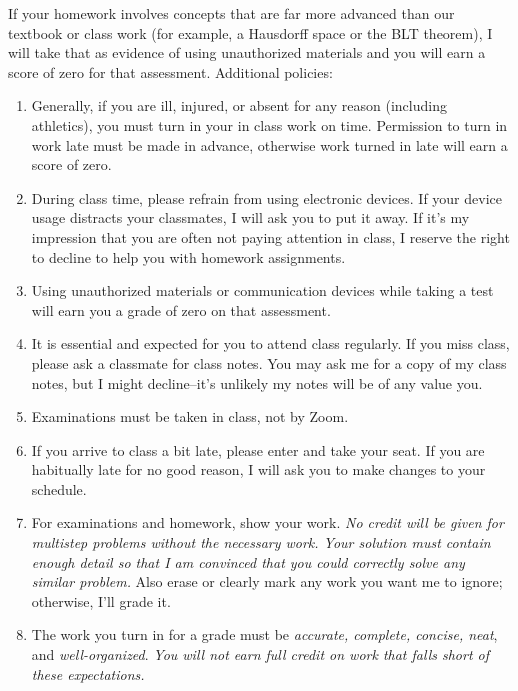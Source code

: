 \documentclass[12pt]{article}
\newcounter{ex}\setcounter{ex}{0}
\begin{document}
If your homework involves concepts that are far more advanced than
our textbook or class work (for example, a Hausdorff space or the 
BLT theorem), I will take that as evidence of using unauthorized 
materials and you will earn a score of zero for that assessment.
Additional policies:
\begin{enumerate}

\item Generally, if you are ill, injured,  or absent for any reason (including 
athletics), you must turn in your in class work on time. Permission to
turn in work late must be made in advance, otherwise work turned in 
late will earn a score of zero.

\item During class time, please refrain from using electronic devices. If your 
device usage distracts your classmates, I will ask you to put it away. If it's my 
impression that you are often not paying attention in class, I reserve the right to 
decline to help you with homework assignments.

\item Using unauthorized materials or communication devices while taking a 
test will earn you a grade of zero on that assessment.  

\item It is essential and expected for you to attend class regularly. If you miss class, 
please ask a classmate for class notes. You may ask me for a copy 
of my class notes, but I might decline--it's unlikely my notes will be of any value 
you.

\item Examinations must be taken in class, not by Zoom.

\item If you arrive to class a bit late, please enter and take your seat. If you are
habitually late for no good reason, I will ask you to make changes to your schedule.


\item For examinations and homework, show your work.  
\emph{No credit will be given for multistep problems without the necessary work. Your solution must contain enough detail
so that I am convinced that you could correctly solve any similar problem.} Also erase or clearly mark any work you want me to ignore; otherwise,
I'll grade it.  

\item The work you turn in for a grade must be \emph{accurate, 
complete, concise, neat}, and \emph{well-organized}.  
\emph{You will not earn full credit on work that falls short of 
these expectations.}


\end{enumerate}
\end{document}
